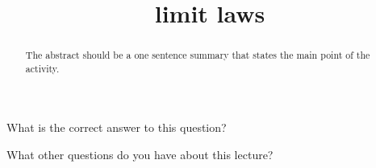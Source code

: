 \documentclass{ximera}
\title{limit laws}
\begin{document}
\begin{abstract}
  The abstract should be a one sentence summary that states the main point of the activity.
\end{abstract}

\maketitle

\begin{question}
  What is the correct answer to this question?

  \begin{solution}
    \begin{multiple-choice}
    \end{multiple-choice}  
  \end{solution}
\end{question}

What other questions do you have about this lecture?
\begin{free-response}
\end{free-response}
\end{document}
